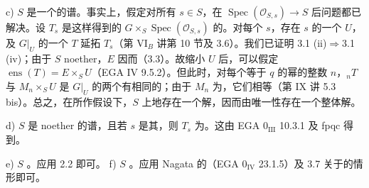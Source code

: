 c) $S$ 是一个的谱。事实上，假定对所有 $s\in S$，在 $\operatorname{Spec}(\mathcal O_{S,s})\to S$ 后问题都已解决。设 $T_s$ 是这样得到的 $G\times_S\operatorname{Spec}(\mathcal O_{S,s})$ 的。对每个 $s$，存在 $s$ 的一个 $U$，及 $G|_U$ 的一个 $T$ 延拓 $T_s$（第 VI$_B$ 讲第 10 节及 3.6）。我们已证明 3.1 (ii)$\Rightarrow$3.1 (iv)；由于 $S$ noether，$E$ 因而（3.3）。故缩小 $U$ 后，可以假定 $\operatorname{ens}(T)=E\times_S U$（EGA IV 9.5.2）。但此时，对每个等于 $q$ 的幂的整数 $n$，${}_nT$ 与 $M_n\times_S U$ 是 $G|_U$ 的两个有相同的；由于 $M_n$ 为，它们相等（第 IX 讲 5.3 bis）。总之，在所作假设下，$S$ 上地存在一个解，因而由唯一性存在一个整体解。

d) $S$ 是 noether 的谱，且若 $s$ 是其，则 $T_s$ 为。这由 EGA 0$_{\mathrm{III}}$ 10.3.1 及 fpqc 得到。

e) $S$ 。应用 2.2 即可。
f) $S$ 。应用 Nagata 的（EGA 0$_{\mathrm{IV}}$ 23.1.5）及 3.7 关于的情形即可。

